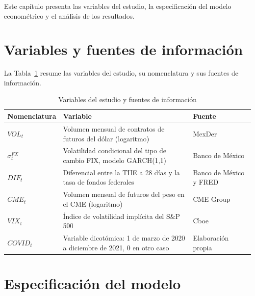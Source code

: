 Este capítulo presenta las variables del estudio, la especificación del modelo econométrico y el análisis de los resultados.


\section{Variables y fuentes de información}


La Tabla~\ref{tab:variables} resume las variables del estudio, su nomenclatura y sus fuentes de información.

\begin{table}[H]
\caption{Variables del estudio y fuentes de información}
\label{tab:variables}
\small{}
\begin{tabular}{@{}lp{7.6cm}l@{}}
\toprule
Nomenclatura & Variable & Fuente \\
\midrule
$\mathit{VOL}_t$ & Volumen mensual de contratos de futuros del dólar (logaritmo) & MexDer \\
$\sigma_t^{FX}$ & Volatilidad condicional del tipo de cambio FIX, modelo GARCH(1,1) & Banco de México \\
$\mathit{DIF}_t$ & Diferencial entre la TIIE a 28 días y la tasa de fondos federales & Banco de México y FRED \\
$\mathit{CME}_t$ & Volumen mensual de futuros del peso en el CME (logaritmo) & CME Group \\
$\mathit{VIX}_t$ & Índice de volatilidad implícita del S\&P 500 & Cboe \\
$\mathit{COVID}_t$ & Variable dicotómica: 1 de marzo de 2020 a diciembre de 2021, 0 en otro caso & Elaboración propia \\
\bottomrule
\end{tabular}
\end{table}

\section{Especificación del modelo}


